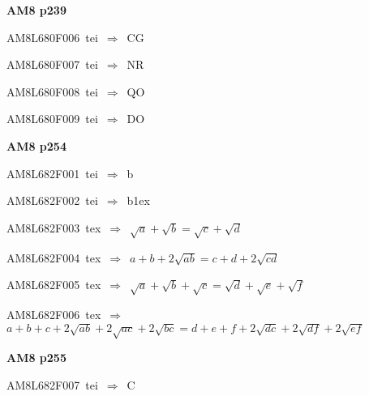 \par\vfill\eject
{\bf\hfill AM8 p239\hfill\hbox{}}\par\bigskip
{\sixrm AM8L680F006\ {\sixit tei}\ }$\Rightarrow$\ CG\par\smallskip
{\sixrm AM8L680F007\ {\sixit tei}\ }$\Rightarrow$\ NR\par\smallskip
{\sixrm AM8L680F008\ {\sixit tei}\ }$\Rightarrow$\ QO\par\smallskip
{\sixrm AM8L680F009\ {\sixit tei}\ }$\Rightarrow$\ DO\par\smallskip

\par\vfill\eject
{\bf\hfill AM8 p254\hfill\hbox{}}\par\bigskip
{\sixrm AM8L682F001\ {\sixit tei}\ }$\Rightarrow$\ {\tenit b}\par\smallskip
{\sixrm AM8L682F002\ {\sixit tei}\ }$\Rightarrow$\ {\tenit b}\raise1ex\hbox{}\par\smallskip
{\sixrm AM8L682F003\ {\sixit tex}\ }$\Rightarrow$\ $\sqrt{a} + \sqrt{b} = \sqrt{c} + \sqrt{d}$\par\smallskip
{\sixrm AM8L682F004\ {\sixit tex}\ }$\Rightarrow$\ $a + b + 2\sqrt{ab} = c + d + 2\sqrt{cd}$\par\smallskip
{\sixrm AM8L682F005\ {\sixit tex}\ }$\Rightarrow$\ $\sqrt{a} + \sqrt{b} + \sqrt{c} = \sqrt{d} + \sqrt{e} + \sqrt{f}$\par\smallskip
{\sixrm AM8L682F006\ {\sixit tex}\ }$\Rightarrow$\ $a + b + c + 2\sqrt{ab} + 2\sqrt{ac} + 2\sqrt{bc} = d + e + f +  2\sqrt{dc} + 2\sqrt{df} + 2\sqrt{ef}$\par\smallskip

\par\vfill\eject
{\bf\hfill AM8 p255\hfill\hbox{}}\par\bigskip
{\sixrm AM8L682F007\ {\sixit tei}\ }$\Rightarrow$\ {\tenit C}\par\smallskip

